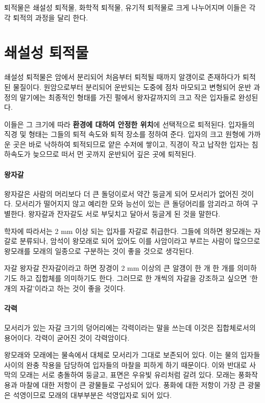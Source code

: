 \documentclass[12pt, a4paper, twoside]{book}
\begin{document}
			퇴적물은 쇄설성 퇴적물, 화학적 퇴적물, 유기적 퇴적물로 크게 나누어지며 이들은 각각 퇴적의 과정을 달리 한다.






	\clearpage
	\section{쇄설성 퇴적물}

		쇄설성 퇴적물은 암에서 분리되어 처음부터 퇴적될 때까지 알갱이로 존재하다가 퇴적된 물질이다.
		원암으로부터 분리되어 운반되는 도중에 점차 마모되고 변형되어 
		운반 과정의 말기에는 최종적인 형태를 가진 펄에서 왕자갈까지의 크고 작은 입자들로 완성된다.

		이들은 그 크기에 따라 \textbf{환경에 대하여 안정한 위치}에 선택적으로 퇴적된다. 
		입자들의 직경 및 형태는 그들의 퇴적 속도와 퇴적 장소를 정하여 준다. 
		입자의 크고 원형에 가까운 곳은 바로 낙하하여 퇴적되므로 얕은 수저에 쌓이고, 
		직경이 작고 납작한 입자는 침하속도가 늦으므로 떠서 먼 곳까지 운반되어 깊은 곳에 퇴적된다.

		\paragraph{왕자갈}
		왕자갈은 사람의 머리보다 더 큰 돌덩이로서 약간 둥글게 되어 모서리가 없어진 것이다.
		모서리가 떨어지지 않고 예리한 모와 능선이 있는 큰 돌덩어리를 암괴라고 하여 구별한다.
		왕자갈과 잔자갈도 서로 부딪치고 달아서 둥글게 된 것을 말한다.

		학자에 따라서는 2 mm 이상 되는 입자를 자갈로 취급한다.
		그들에 의하면 왕모래는 자갈로 분류되나, 
		암석이 왕모래로 되어 있어도 이를 사암이라고 부르는 사람이 많으므로 
		왕모래를 모래의 일종으로 구분하는 것이 좋을 것으로 생각된다.

		자갈 왕자갈 잔자갈이라고 하면 장경이 2 mm 이상의 큰 알갱이 한 개 한 개를 의미하기도 하고 집합체를 의미하기도 한다.
		그러므로 한 개씩의 자갈을 강조하고 싶으면 '한 개의 자갈'이라고 하는 것이 좋을 것이다. 


		\paragraph{각력}
		모서리가 있는 자갈 크기의 덩어리에는 각력이라는 말을 쓰는데 이것은 집합체로서의 용어이다.
		각력이 굳어진 것이 각력암이다.


		왕모래와 모래에는 물속에서 대체로 모서리가 그대로 보존되어 있다. 
		이는 물의 입자들 사이의 완충 작용을 담당하여 입자들의 마찰을 피하게 하기 때문이다.
		이와 반대로 사막의 모래는 서로 충돌하여 둥글고, 표면은 우유빛 유리처럼 갈려 있다.
		모래는 풍화작용과 마찰에 대한 저항이 큰 광물들로 구성되어 있다.
		풍화에 대한 저항이 가장 큰 광물은 석영이므로 모래의 대부부분은 석영입자로 되어 있다.
\end{document}
